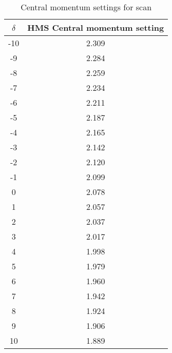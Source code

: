 \documentclass[]{article}
\begin{document}
\begin{table}[h]
	\begin{center}
		\begin{tabular}[]{|c|c|} \hline
$\delta$ & HMS Central momentum setting \\ \hline \hline
	-10	&2.309\\ \hline
	-9	&2.284\\ \hline
	-8	&2.259\\ \hline
	-7	&2.234\\ \hline
	-6	&2.211\\ \hline
	-5	&2.187\\ \hline
	-4	&2.165\\ \hline
	-3	&2.142\\ \hline
	-2	&2.120\\ \hline
	-1	&2.099\\ \hline
	0	&2.078\\ \hline
	1	&2.057\\ \hline
	2	&2.037\\ \hline
	3	&2.017\\ \hline
	4	&1.998\\ \hline
	5	&1.979\\ \hline
	6	&1.960\\ \hline
	7	&1.942\\ \hline
	8	&1.924\\ \hline
	9	&1.906\\ \hline
	10	&1.889\\ \hline
			\end{tabular}
			\caption{Central momentum settings for scan}
			\label{tab:central}
		\end{center}
	\end{table}
	
\end{document}
